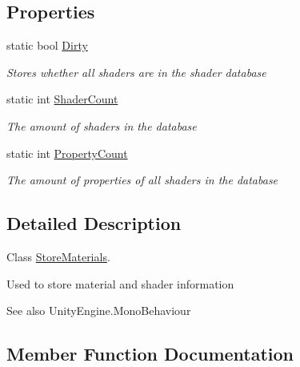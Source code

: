 \subsection*{Properties}
\begin{DoxyCompactItemize}
\item 
static bool \hyperlink{class_serialization_1_1_store_materials_a7ef95ec78cde8e4efd87219e894f787e}{Dirty}
\begin{DoxyCompactList}\small\item\em Stores whether all shaders are in the shader database \end{DoxyCompactList}\item 
static int \hyperlink{class_serialization_1_1_store_materials_a85dc6222193d5de3769b0c3a47177d31}{Shader\+Count}
\begin{DoxyCompactList}\small\item\em The amount of shaders in the database \end{DoxyCompactList}\item 
static int \hyperlink{class_serialization_1_1_store_materials_a6c350a4fb4831f884c854e083779a82e}{Property\+Count}
\begin{DoxyCompactList}\small\item\em The amount of properties of all shaders in the database \end{DoxyCompactList}\end{DoxyCompactItemize}


\subsection{Detailed Description}
Class \hyperlink{class_serialization_1_1_store_materials}{Store\+Materials}. 

Used to store material and shader information 

\begin{DoxySeeAlso}{See also}
Unity\+Engine.\+Mono\+Behaviour


\end{DoxySeeAlso}


\subsection{Member Function Documentation}
\mbox{\label{class_serialization_1_1_store_materials_a2914565dc84d7412884c11abb412c5ff}} 
